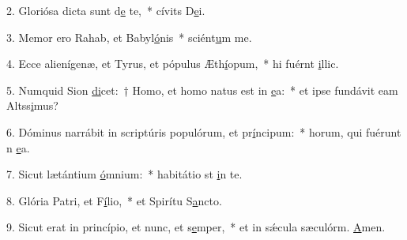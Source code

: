 2. Gloriósa dicta sunt d\uline{e} te,~* cívits D\uline{e}i.\par 
3. Memor ero Rahab, et Babyl\uline{ó}nis~* sciént\uline{u}m me.\par 
4. Ecce alienígenæ, et Tyrus, et pópulus Æth\uline{í}opum,~* hi fuérnt \uline{i}llic.\par 
5. Numquid Sion \uline{di}cet:~† Homo, et homo natus est in \uline{e}a:~* et ipse fundávit eam Altss\uline{i}mus?\par 
6. Dóminus narrábit in scriptúris populórum, et pr\uline{í}ncipum:~* horum, qui fuérunt n \uline{e}a.\par 
7. Sicut lætántium \uline{ó}mnium:~* habitátio st \uline{i}n te.\par 
8. Glória Patri, et F\uline{í}lio,~* et Spirítu S\uline{a}ncto.\par 
9. Sicut erat in princípio, et nunc, et s\uline{e}mper,~* et in sǽcula sæculórm. \uline{A}men.\par 

